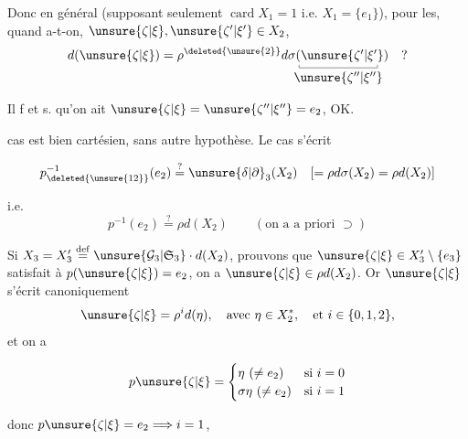 Donc en général (supposant seulement $\operatorname{card}X_1=1$ i.e. $X_1=\{e_1\}$),  pour les, quand a-t-on,  $\unsure{\zeta|\xi},\unsure{\zeta'|\xi'}\in X_2$,
\[
d(\unsure{\zeta|\xi})=\rho^{\deleted{\unsure{2}}}d
\begin{array}[t]{@{}c@{}}
\sigma(\unsure{\zeta'|\xi'})\\[-1.15ex]
\rule{.3pt}{.6ex}\rule{2.15cm}{.3pt}\rule{.3pt}{.6ex}\\[-.4ex]
\unsure{\zeta''|\xi''}
\end{array}
\quad ?
\]

Il f et s. qu'on ait 
$\unsure{\zeta|\xi}=\unsure{\zeta''|\xi''}=e_2$,
\quad OK.

 cas est bien cartésien, sans autre hypothèse. Le cas  \unsure{$(**)$} s'écrit

\[
p_{\deleted{\unsure{12}}}^{-1}(e_2)\overset{?}=\unsure{\delta|\partial}_3(X_2)\quad[=\rho d\sigma(X_2)=\rho d(X_2)]
\]


 i.e.
\[
p^{-1}(e_2)\overset{?}=\rho d(X_2)\qquad(\text{on a a priori }\supset)
\]

Si $X_3=X'_3\overset{\mathrm{def}}=\unsure{\mathcal G_3|\mathfrak S_3}\cdot d(X_2)$,
  prouvons que   $\unsure{\zeta|\xi}\in X'_3\setminus\{e_3\}$ satisfait à $p(\unsure{\zeta|\xi})=e_2$, on a $\unsure{\zeta|\xi}\in\rho d(X_2)$. Or $\unsure{\zeta|\xi}$ s'écrit canoniquement
\[
\unsure{\zeta|\xi}=\rho^i d(\eta),\quad\text{avec }\eta\in X_2^*,\quad\text{et }i\in\{0,1,2\},
\]
et on a

\[
p\unsure{\zeta|\xi}=\begin{cases}
\eta\ (\ne e_2)&\text{si }i=0\\
\sigma\eta\ (\ne e_2)&\text{si }i=1
\end{cases}
\]


donc $p\unsure{\zeta|\xi}=e_2\Longrightarrow i=1$, 
